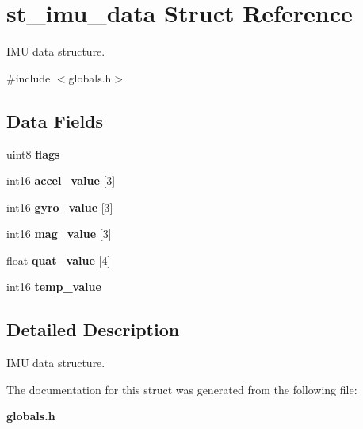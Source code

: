 \section{st\+\_\+imu\+\_\+data Struct Reference}
\label{structst__imu__data}


I\+MU data structure.  




{\ttfamily \#include $<$globals.\+h$>$}

\subsection*{Data Fields}
\begin{DoxyCompactItemize}
\item 
\mbox{\label{structst__imu__data_acd8859336a5cb8a70051c97a438726a1}} 
uint8 {\bfseries flags}
\item 
\mbox{\label{structst__imu__data_a76e9575b13f4c390ccec733a5dac028f}} 
int16 {\bfseries accel\+\_\+value} [3]
\item 
\mbox{\label{structst__imu__data_a515e671f6e4fe912e9af6c73a8d654b9}} 
int16 {\bfseries gyro\+\_\+value} [3]
\item 
\mbox{\label{structst__imu__data_ae78e11a5f5ad413f738f6eb69ac60277}} 
int16 {\bfseries mag\+\_\+value} [3]
\item 
\mbox{\label{structst__imu__data_a2825af9e90a3b4d11e0f99f34a73d555}} 
float {\bfseries quat\+\_\+value} [4]
\item 
\mbox{\label{structst__imu__data_a093731ce8df43a5beb8df6e78368ec4c}} 
int16 {\bfseries temp\+\_\+value}
\end{DoxyCompactItemize}


\subsection{Detailed Description}
I\+MU data structure. 



The documentation for this struct was generated from the following file\+:\begin{DoxyCompactItemize}
\item 
\textbf{ globals.\+h}\end{DoxyCompactItemize}
